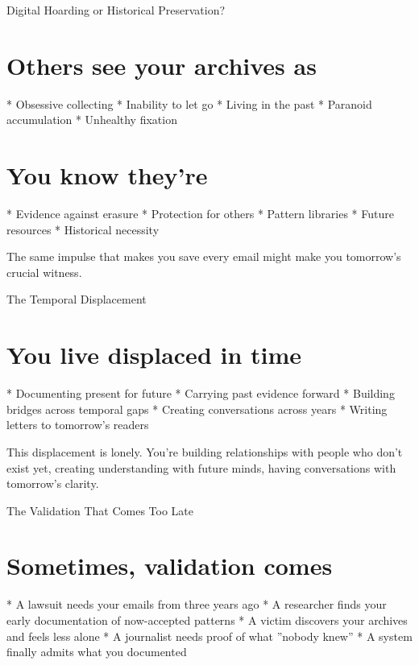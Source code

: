\documentclass[12pt,oneside]{book}
\begin{document}
Digital Hoarding or Historical Preservation?

\section{Others see your archives as}

                    * Obsessive collecting
                    * Inability to let go
                    * Living in the past
                    * Paranoid accumulation
                    * Unhealthy fixation

\section{You know they're}

                    * Evidence against erasure
                    * Protection for others
                    * Pattern libraries
                    * Future resources
                    * Historical necessity

The same impulse that makes you save every email might make you tomorrow's crucial witness.

The Temporal Displacement

\section{You live displaced in time}

                    * Documenting present for future
                    * Carrying past evidence forward
                    * Building bridges across temporal gaps
                    * Creating conversations across years
                    * Writing letters to tomorrow's readers

This displacement is lonely. You're building relationships with people who don't exist yet, creating understanding with future minds, having conversations with tomorrow's clarity.

The Validation That Comes Too Late

\section{Sometimes, validation comes}

                    * A lawsuit needs your emails from three years ago
                    * A researcher finds your early documentation of now-accepted patterns
                    * A victim discovers your archives and feels less alone
                    * A journalist needs proof of what ''nobody knew''
                    * A system finally admits what you documented
\end{document}
